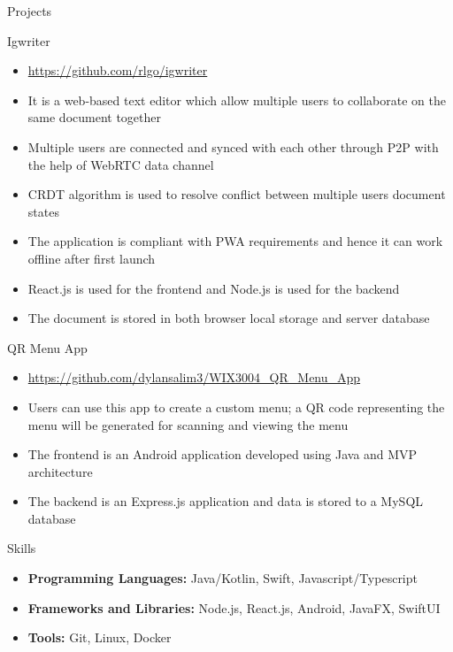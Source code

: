 \documentclass[]{mcdowellcv}
\begin{document}
\begin{cvsection}{Projects}
	\begin{cvsubsection}{Igwriter}{}{}
		\begin{itemize}
			\item \url{https://github.com/rlgo/igwriter}
			\item It is a web-based text editor which allow multiple users to collaborate on the same document together
			\item Multiple users are connected and synced with each other through P2P with the help of WebRTC data channel
			\item CRDT algorithm is used to resolve conflict between multiple users document states
			\item The application is compliant with PWA requirements and hence it can work offline after first launch
			\item React.js is used for the frontend and Node.js is used for the backend
			\item The document is stored in both browser local storage and server database
		\end{itemize}
	\end{cvsubsection}
	\begin{cvsubsection}{QR Menu App}{}{}
		\begin{itemize}
			\item \url{https://github.com/dylansalim3/WIX3004\_QR\_Menu\_App}
			\item Users can use this app to create a custom menu; a QR code representing the menu will be generated for scanning and viewing the menu
			\item The frontend is an Android application developed using Java and MVP architecture
			\item The backend is an Express.js application and data is stored to a MySQL database
		\end{itemize}
	\end{cvsubsection}
\end{cvsection}
\begin{cvsection}{Skills}
	\begin{cvsubsection}{}{}{}
		\begin{itemize}
			\item \textbf{Programming Languages:}  Java/Kotlin, Swift, Javascript/Typescript
			\item \textbf{Frameworks and Libraries:}  Node.js, React.js, Android, JavaFX, SwiftUI
			\item \textbf{Tools:}  Git, Linux, Docker
		\end{itemize}
	\end{cvsubsection}
\end{cvsection}
\end{document}
